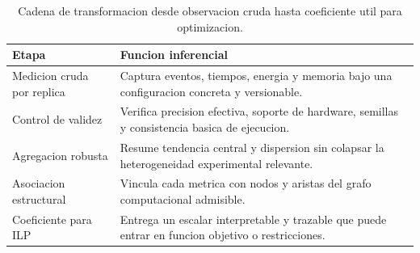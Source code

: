 \begin{table}[t]
\centering
\caption{Cadena de transformacion desde observacion cruda hasta coeficiente util para optimizacion.}
\label{tab:profiling-inference-chain}
\small
\begin{tabularx}{\textwidth}{lX}
\toprule
Etapa & Funcion inferencial \\
\midrule
Medicion cruda por replica & Captura eventos, tiempos, energia y memoria bajo una configuracion concreta y versionable. \\
Control de validez & Verifica precision efectiva, soporte de hardware, semillas y consistencia basica de ejecucion. \\
Agregacion robusta & Resume tendencia central y dispersion sin colapsar la heterogeneidad experimental relevante. \\
Asociacion estructural & Vincula cada metrica con nodos y aristas del grafo computacional admisible. \\
Coeficiente para ILP & Entrega un escalar interpretable y trazable que puede entrar en funcion objetivo o restricciones. \\
\bottomrule
\end{tabularx}
\normalsize
\end{table}

